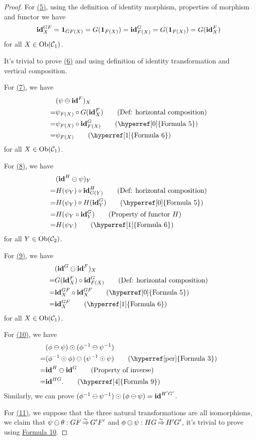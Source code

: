 \documentclass{article}
\begin{document}
\begin{proof}
	For \hyperref[0]{(5)}, using the definition of identity morphism, properties of morphism and functor we have
		$$\mathbf{id}^{GF}_X=\mathbf{1}_{GF(X)}=G(\mathbf{1}_{F(X)})=\mathbf{id}^G_{F(X)}=G(\mathbf{1}_{F(X)})=G(\mathbf{id}^F_X)$$
	for all $X\in\mathrm{Ob}(\mathcal{C}_1)$.
	
	It's trivial to prove \hyperref[1]{(6)} and using definition of identity transformation and vertical composition.
	
	For \hyperref[2]{(7)}, we have
	\begin{align*}
		 & (\psi\ominus\tid^F)_X\\
		=& \psi_{F(X)}\circ G(\tid^F_X)\tag{Def: horizontal composition}\\
		=& \psi_{F(X)}\circ \tid^G_{F(X)}\tag{\hyperref[0]{Formula 5}}\\
		=& \psi_{F(X)}\tag{\hyperref[1]{Formula 6}}
	\end{align*}
	for all $X\in\mathrm{Ob}(\mathcal{C}_1)$.
	
	For \hyperref[3]{(8)}, we have
	\begin{align*}
		 & (\tid^H\ominus\psi)_Y\\
		=& H(\psi_Y)\circ\tid^H_{G(Y)}\tag{Def: horizontal composition}\\
		=& H(\psi_Y)\circ H(\tid^G_Y)\tag{\hyperref[0]{Formula 5}}\\
		=& H(\psi_Y\circ\tid^G_Y)\tag{Property of functor $H$}\\
		=& H(\psi_Y)\tag{\hyperref[1]{Formula 6}}
	\end{align*}
	for all $Y\in\mathrm{Ob}(\mathcal{C}_2)$.
	
	For \hyperref[4]{(9)}, we have 
	\begin{align*}
		 & (\tid^G\ominus\tid^F)_X\\
		=& G(\tid^F_X)\circ\tid^G_{F(X)}\tag{Def: horizontal composition}\\
		=& \tid^{GF}_X\circ\tid^{GF}_X\tag{\hyperref[0]{Formula 5}}\\
		=& \tid^{GF}_X\tag{\hyperref[1]{Formula 6}}
	\end{align*}
	for all $X\in\mathrm{Ob}(\mathcal{C}_1)$.
	
	For \hyperref[5]{(10)}, we have
	\begin{align*}
		 & (\phi\ominus\psi)\odot(\phi\iv\ominus\psi\iv)\\
		=& (\phi\iv\odot\phi)\ominus(\psi\iv\odot\psi)\tag{\hyperref[per]{Formula 3}}\\
		=& \tid^H\ominus\tid^G\tag{Property of inverse}\\
		=& \tid^{HG}.\tag{\hyperref[4]{Formula 9}}
	\end{align*}
	Similarly, we can prove $(\phi^{-1}\ominus\psi^{-1})\odot(\phi\ominus\psi)=\mathbf{id}^{H'G'}$.
	
	For \hyperref[6]{(11)}, we suppose that the three natural transformations are all isomorphisms, we claim that $\psi\ominus\theta:GF\mathop{\Rightarrow}\limits^{\sim} G'F'$ and $\phi\ominus\psi:HG\mathop{\Rightarrow}\limits^{\sim} H'G'$, it's trivial to prove using \hyperref[5]{Formula 10}.
\end{proof}
\end{document}
